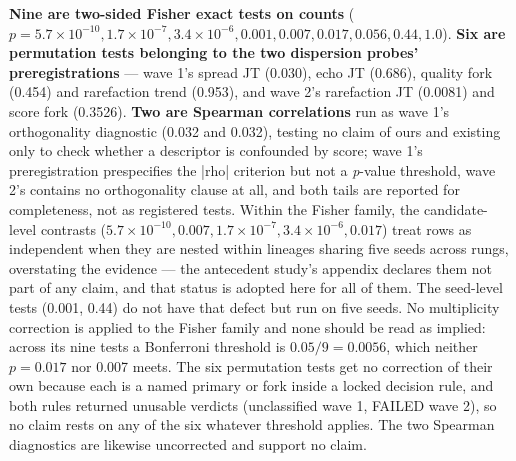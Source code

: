 \textbf{Nine are two-sided Fisher exact tests on counts} ($p = 5.7\times10^{-10}, 1.7\times10^{-7}, 3.4\times10^{-6}, 0.001, 0.007, 0.017, 0.056, 0.44, 1.0$). \textbf{Six are permutation tests belonging to the two dispersion probes' preregistrations} --- wave 1's spread JT (0.030), echo JT (0.686), quality fork (0.454) and rarefaction trend (0.953), and wave 2's rarefaction JT (0.0081) and score fork (0.3526). \textbf{Two are Spearman correlations} run as wave 1's orthogonality diagnostic (0.032 and 0.032), testing no claim of ours and existing only to check whether a descriptor is confounded by score; wave 1's preregistration prespecifies the |rho| criterion but not a \emph{p}-value threshold, wave 2's contains no orthogonality clause at all, and both tails are reported for completeness, not as registered tests. Within the Fisher family, the candidate-level contrasts ($5.7\times10^{-10}, 0.007, 1.7\times10^{-7}, 3.4\times10^{-6}, 0.017$) treat rows as independent when they are nested within lineages sharing five seeds across rungs, overstating the evidence --- the antecedent study's appendix declares them not part of any claim, and that status is adopted here for all of them. The seed-level tests (0.001, 0.44) do not have that defect but run on five seeds. No multiplicity correction is applied to the Fisher family and none should be read as implied: across its nine tests a Bonferroni threshold is $0.05/9 = 0.0056$, which neither $p = 0.017$ nor 0.007 meets. The six permutation tests get no correction of their own because each is a named primary or fork inside a locked decision rule, and both rules returned unusable verdicts (unclassified wave 1, FAILED wave 2), so no claim rests on any of the six whatever threshold applies. The two Spearman diagnostics are likewise uncorrected and support no claim.


